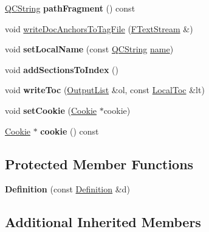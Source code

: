 \begin{DoxyCompactItemize}
\mbox{\label{class_definition_afd039575cd4a6caede20780d4a65d8ac}} 
\mbox{\hyperlink{class_q_c_string}{Q\+C\+String}} {\bfseries path\+Fragment} () const
\item 
void \mbox{\hyperlink{class_definition_a30b5bc6680190c9d62c090f0627392d5}{write\+Doc\+Anchors\+To\+Tag\+File}} (\mbox{\hyperlink{class_f_text_stream}{F\+Text\+Stream}} \&)
\item 
\mbox{\label{class_definition_ac20deb4c9dab79868fa8ec4f42ac84ff}} 
void {\bfseries set\+Local\+Name} (const \mbox{\hyperlink{class_q_c_string}{Q\+C\+String}} \mbox{\hyperlink{class_definition_a9324000f785d7b6b098878a3bca4df5b}{name}})
\item 
\mbox{\label{class_definition_af4b179bb64137b2e0b3da44b7b4d0f24}} 
void {\bfseries add\+Sections\+To\+Index} ()
\item 
\mbox{\label{class_definition_a28ddfb02d84dcdcf19513a1f194fc524}} 
void {\bfseries write\+Toc} (\mbox{\hyperlink{class_output_list}{Output\+List}} \&ol, const \mbox{\hyperlink{class_local_toc}{Local\+Toc}} \&lt)
\item 
\mbox{\label{class_definition_a1f5160ecb8266412bc0948db58b3fa2a}} 
void {\bfseries set\+Cookie} (\mbox{\hyperlink{struct_definition_1_1_cookie}{Cookie}} $\ast$cookie)
\item 
\mbox{\label{class_definition_a2f324c6507f47c45129c845084266ddf}} 
\mbox{\hyperlink{struct_definition_1_1_cookie}{Cookie}} $\ast$ {\bfseries cookie} () const
\end{DoxyCompactItemize}
\subsection*{Protected Member Functions}
\begin{DoxyCompactItemize}
\item 
\mbox{\label{class_definition_a952d6c4a004165c823988111910e08cd}} 
{\bfseries Definition} (const \mbox{\hyperlink{class_definition}{Definition}} \&d)
\end{DoxyCompactItemize}
\subsection*{Additional Inherited Members}


